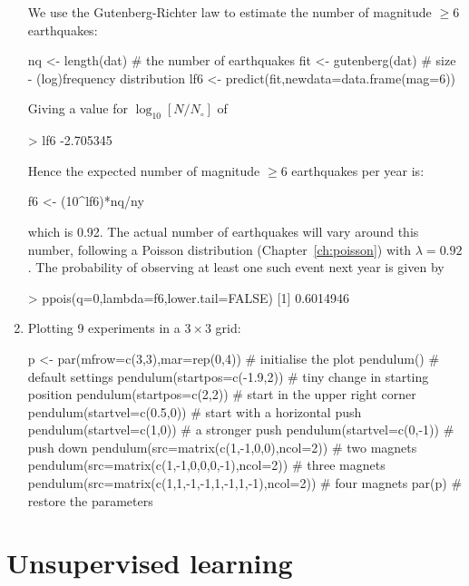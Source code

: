 \begin{enumerate}
We use the Gutenberg-Richter law to estimate the number of magnitude
$\geq{6}$ earthquakes:

\begin{script}[firstnumber=6]
nq <- length(dat)           # the number of earthquakes
fit <- gutenberg(dat)       # size - (log)frequency distribution
lf6 <- predict(fit,newdata=data.frame(mag=6))
\end{script}

Giving a value for $\log_{10}[N/N_\circ]$ of

\begin{console}
> lf6
-2.705345 
\end{console}

Hence the expected number of magnitude $\geq{6}$ earthquakes per year
is:

\begin{script}[firstnumber=9]
f6 <- (10^lf6)*nq/ny
\end{script}

\noindent which is 0.92. The actual number of earthquakes will vary
around this number, following a Poisson distribution
(Chapter~\ref{ch:poisson}) with $\lambda=0.92$. The probability of
observing at least one such event next year is given by

\begin{console}
> ppois(q=0,lambda=f6,lower.tail=FALSE)
[1] 0.6014946
\end{console}

\item Plotting 9 experiments in a ${3}\times{3}$ grid:

\begin{script}
p <- par(mfrow=c(3,3),mar=rep(0,4)) # initialise the plot
pendulum()                          # default settings
pendulum(startpos=c(-1.9,2))        # tiny change in starting position
pendulum(startpos=c(2,2))           # start in the upper right corner
pendulum(startvel=c(0.5,0))         # start with a horizontal push
pendulum(startvel=c(1,0))           # a stronger push
pendulum(startvel=c(0,-1))          # push down
pendulum(src=matrix(c(1,-1,0,0),ncol=2))             # two magnets
pendulum(src=matrix(c(1,-1,0,0,0,-1),ncol=2))        # three magnets
pendulum(src=matrix(c(1,1,-1,-1,1,-1,1,-1),ncol=2))  # four magnets
par(p)                              # restore the parameters
\end{script}
  
\end{enumerate}

\section{Unsupervised learning}
\label{sec:sol-unsupervised}

